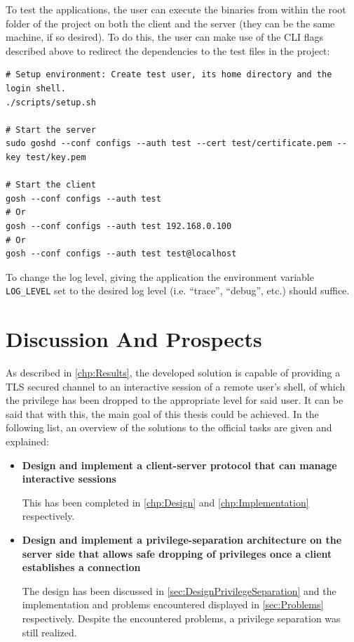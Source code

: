 \documentclass[10pt,a4paper,titlepage,twoside,english,final]{zhawreprt}
\begin{document}
To test the applications, the user can execute the binaries from within the root folder of the project on both the client and the server (they can be the same machine, if so desired).
To do this, the user can make use of the \gls{CLI} flags described above to redirect the dependencies to the test files in the project:
\setlistingBash
\begin{lstlisting}[caption={Running the applications for test purposes},label=lst:RunProject]
# Setup environment: Create test user, its home directory and the login shell.
./scripts/setup.sh

# Start the server
sudo goshd --conf configs --auth test --cert test/certificate.pem --key test/key.pem

# Start the client
gosh --conf configs --auth test
# Or
gosh --conf configs --auth test 192.168.0.100
# Or
gosh --conf configs --auth test test@localhost
\end{lstlisting}

To change the log level, giving the application the environment variable \texttt{LOG\_LEVEL} set to the desired log level (i.e. ``trace'', ``debug'', etc.) should suffice.

\chapter{Discussion And Prospects}\label{chp:DiscussionAndProspects}
As described in \ref{chp:Results}, the developed solution is capable of providing a \gls{TLS} secured channel to an interactive session of a remote user's \gls{shell}, of which the privilege has been dropped to the appropriate level for said user.
It can be said that with this, the main goal of this thesis could be achieved.
In the following list, an overview of the solutions to the official tasks are given and explained:
\begin{itemize}
\item \textbf{Design and implement a client-server protocol that can manage interactive sessions}

This has been completed in \ref{chp:Design} and \ref{chp:Implementation} respectively.

\item \textbf{Design and implement a privilege-separation architecture on the server side that allows safe dropping of privileges once a client establishes a connection}

The design has been discussed in \ref{sec:DesignPrivilegeSeparation} and the implementation and problems encountered displayed in \ref{sec:Problems} respectively.
Despite the encountered problems, a privilege separation was still realized.
\end{itemize}
\end{document}
